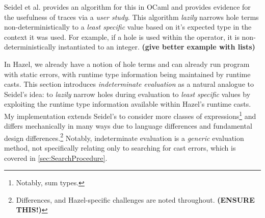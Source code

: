 Seidel et al. \cite{SearchProc} provides an algorithm for this in OCaml and provides evidence for the usefulness of traces via a \textit{user study}. This algorithm \textit{lazily} narrows hole terms non-deterministically to a \textit{least specific} value based on it's expected type in the context it was used. For example, if a hole is used within the \code{(+)} operator, it is non-deterministically instantiated to an integer. \textbf{(give better example with lists)}

In Hazel, we already have a notion of hole terms and can already run program with static errors, with runtime type information being maintained by runtime casts. This section introduces \textit{indeterminate evaluation} as a natural analogue to Seidel's idea: to \textit{lazily} narrow holes during evaluation to \textit{least specific} values by exploiting the runtime type information available within Hazel's runtime casts. My implementation extends Seidel's to consider more classes of expressions\footnote{Notably, sum types.} and differs mechanically in many ways due to language differences and fundamental design differences.\footnote{Differences, and Hazel-specific challenges are noted throughout. \textbf{(ENSURE THIS!)}} Notably, indeterminate evaluation is a \textit{generic} evaluation method, not specifically relating only to searching for cast errors, which is covered in \cref{sec:SearchProcedure}.

